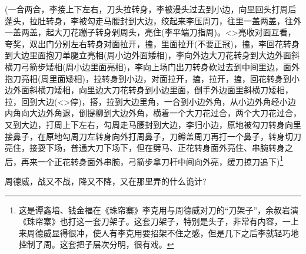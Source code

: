 {({\hwfs 一合两合}，李{\hwfs 接上下左右}，{\hwfs 刀头拉转身}，李{\hwfs 被漫头过去到小边}，{\hwfs 向里回头打}周{\hwfs 后蓬头}，{\hwfs 拉肚转身}，李{\hwfs 被勾走马腰封到大边}，{\hwfs 绞起来}李{\hwfs 压}周{\hwfs 刀}，{\hwfs 往里一盖两盖}，{\hwfs 往外一盖两盖}，{\hwfs 起大刀花蹦子转身剁}周{\hwfs 头}，{\hwfs 亮住}(李{\hwfs 平端刀指}周)。\textless{}\!\textgreater{}{\hwfs 亮收对面互看}，{\hwfs 夸奖}，{\hwfs 双出门分别左右转身对面拉开}，{\hwfs 搕}，{\hwfs 里面拉开}({\hwfs 不要正冠})，{\hwfs 搕}，李{\hwfs 回花转身到大边里面抱刀单腿立亮相}(周{\hwfs 小边外面矮相})，李{\hwfs 向外边大刀花转身到大边外面斜横刀弓箭步矮相}(周{\hwfs 小边里面亮相})，李{\hwfs 向上场门出刀转身砍过去到中间里边}，{\hwfs 面外抱刀亮相}(周{\hwfs 里面矮相})，{\hwfs 拉转身到小边}，{\hwfs 对面拉开}，{\hwfs 搕}，{\hwfs 拉开}，{\hwfs 搕}，{\hwfs 回花转身到小边外面斜横刀矮相}，{\hwfs 向里边大刀花转身到小边里面}，{\hwfs 倒手外边面里斜横刀矮相}，{\hwfs 拉}，{\hwfs 回到大边}(\textless{}\!\textgreater{}{\hwfs 停})，{\hwfs 搭}，{\hwfs 拉到大边里角}，{\hwfs 一合到小边外角}，{\hwfs 从小边外角经小边内角向大边外角退}，{\hwfs 倒提柳到大边外角}，{\hwfs 横着一个大刀花过合}，{\hwfs 两个大刀花过合}，{\hwfs 又到大边}，{\hwfs 打}周{\hwfs 上下左右}，{\hwfs 勾}周{\hwfs 走马腰封到大边}，李{\hwfs 归小边}，{\hwfs 原地被勾刀转身向里接鼻子}，{\hwfs 在原地勾周刀左转身向外打}周{\hwfs 鼻子}，{\hwfs 刀鐏盖}周{\hwfs 刀再打一个鼻子}，{\hwfs 转身切刀亮住}，{\hwfs 接耍下场}，{\hwfs 普通大刀下场下}，{\hwfs 但在劈马}、{\hwfs 正花转身面外亮住}、{\hwfs 串腕转身之后}，{\hwfs 再来一个正花转身面外串腕}，{\hwfs 弓箭步拿刀杆中间向外亮}，{\hwfs 缓刀掠刀追下})\footnote{{\hei 这是谭鑫培、钱金福在《珠帘寨》李克用与周德威对刀的``刀架子''，余叔岩演《珠帘寨》也打这一套刀架子。}这套刀架子，特别是头子，非常有内容，{\hwfs 一上来周德威显得很冲，使人有李克用要招架不住之感，但是几下之后李就轻巧地控制了周。}这套把子层次分明，很有戏。}






周德威，战又不战，降又不降，又在那里弄的什么诡计?

}
